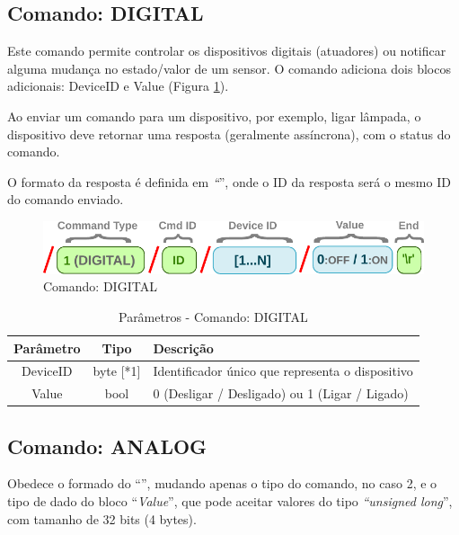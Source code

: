 \subsection{Comando: DIGITAL\label{subsec:DIGITAL}}

Este comando permite controlar os dispositivos digitais (atuadores)
ou notificar alguma mudança no estado/valor de um sensor. O comando
adiciona dois blocos adicionais: DeviceID e Value (Figura \ref{fig:protocol_cmd}). 

Ao enviar um comando para um dispositivo, por exemplo, ligar lâmpada,
o dispositivo deve retornar uma resposta (geralmente assíncrona),
com o status do comando. 

O formato da resposta é definida em \emph{``}'',
onde o ID da resposta será o mesmo ID do comando enviado.

\begin{figure}[H]
\begin{centering}
\includegraphics[width=0.8\linewidth]{Imagens/Cap_4/protocol_cmd_digital}
\par\end{centering}
\caption{Comando: DIGITAL\label{fig:protocol_cmd}}
\end{figure}

\begin{table}[H]
\begin{centering}
\begin{tabular}{|c|c|l|}
\hline 
Parâmetro & Tipo & Descrição\tabularnewline
\hline 
\hline 
DeviceID & byte {[}{*}1{]} & Identificador único que representa o dispositivo\tabularnewline
\hline 
Value & bool & 0 (Desligar / Desligado) ou 1 (Ligar / Ligado)\tabularnewline
\hline 
\end{tabular}
\par\end{centering}
\caption{Parâmetros - Comando: DIGITAL}
\end{table}


\subsection{Comando: ANALOG\label{subsec:ANALOG}}

Obedece o formado do ``'', mudando apenas
o tipo do comando, no caso 2, e o tipo de dado do bloco ``\emph{Value}'',
que pode aceitar valores do tipo \emph{``unsigned long}'', com tamanho
de 32 bits (4 bytes). 

